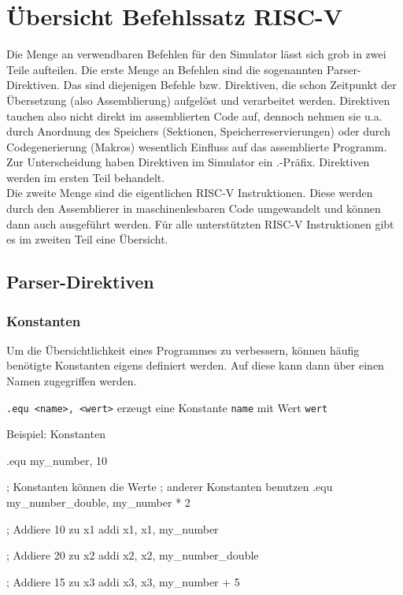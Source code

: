 
\section{Übersicht Befehlssatz RISC-V}

Die Menge an verwendbaren Befehlen für den Simulator lässt sich grob in zwei
Teile aufteilen. Die erste Menge an Befehlen sind die sogenannten
Parser-Direktiven. Das sind diejenigen Befehle bzw. Direktiven, die schon
Zeitpunkt der Übersetzung (also Assemblierung) aufgelöst und verarbeitet werden.
Direktiven tauchen also nicht direkt im assemblierten Code auf, dennoch nehmen
sie u.a. durch Anordnung des Speichers (Sektionen, Speicherreservierungen) oder
durch Codegenerierung (Makros) wesentlich Einfluss auf das assemblierte
Programm. Zur Unterscheidung haben Direktiven im Simulator ein .-Präfix.
Direktiven werden im ersten Teil behandelt.\\
Die zweite Menge sind die eigentlichen RISC-V Instruktionen. Diese werden durch
den Assemblierer in maschinenlesbaren Code umgewandelt und können dann auch
ausgeführt werden. Für alle unterstützten RISC-V Instruktionen gibt es im
zweiten Teil eine Übersicht.

\subsection{Parser-Direktiven}

\subsubsection{Konstanten}
Um die Übersichtlichkeit eines Programmes zu verbessern, können häufig benötigte
Konstanten eigens definiert werden. Auf diese kann dann über einen Namen
zugegriffen werden.

\texttt{.equ <name>, <wert>} erzeugt eine Konstante \texttt{name} mit Wert
\texttt{wert}

\begin{exampleblock}{Beispiel: Konstanten}
	\begin{riscv}
	.equ my_number, 10

	; Konstanten können die Werte
	; anderer Konstanten benutzen
	.equ my_number_double, my_number * 2

	; Addiere 10 zu x1
	addi x1, x1, my_number

	; Addiere 20 zu x2
	addi x2, x2, my_number_double

	; Addiere 15 zu x3
	addi x3, x3, my_number + 5
	\end{riscv}
\end{exampleblock}

